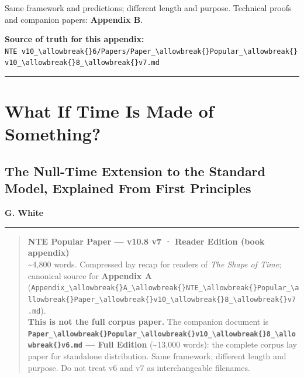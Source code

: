 \documentclass[
  11pt,
]{article}
\begin{document}
Same framework and predictions; different length and purpose. Technical
proofs and companion papers: \textbf{Appendix B}.

\textbf{Source of truth for this appendix:}
\texttt{NTE\ v10\_\textbackslash{}allowbreak\{\}6/Papers/Paper\_\textbackslash{}allowbreak\{\}Popular\_\textbackslash{}allowbreak\{\}v10\_\textbackslash{}allowbreak\{\}8\_\textbackslash{}allowbreak\{\}v7.md}

\begin{center}\rule{0.5\linewidth}{0.5pt}\end{center}

\section{What If Time Is Made of
Something?}\label{what-if-time-is-made-of-something}

\subsection{The Null-Time Extension to the Standard Model, Explained
From First
Principles}\label{the-null-time-extension-to-the-standard-model-explained-from-first-principles}

\textbf{G. White}

\begin{center}\rule{0.5\linewidth}{0.5pt}\end{center}

\begin{quote}
\textbf{NTE Popular Paper --- v10.8 v7 · Reader Edition (book
appendix)}\\
\textasciitilde4,800 words. Compressed lay recap for readers of
\emph{The Shape of Time}; canonical source for \textbf{Appendix A}
(\texttt{Appendix\_\textbackslash{}allowbreak\{\}A\_\textbackslash{}allowbreak\{\}NTE\_\textbackslash{}allowbreak\{\}Popular\_\textbackslash{}allowbreak\{\}Paper\_\textbackslash{}allowbreak\{\}v10\_\textbackslash{}allowbreak\{\}8\_\textbackslash{}allowbreak\{\}v7.md}).\\
\textbf{This is not the full corpus paper.} The companion document is
\textbf{\texttt{Paper\_\textbackslash{}allowbreak\{\}Popular\_\textbackslash{}allowbreak\{\}v10\_\textbackslash{}allowbreak\{\}8\_\textbackslash{}allowbreak\{\}v6.md}
--- Full Edition} (\textasciitilde13,000 words): the complete corpus lay
paper for standalone distribution. Same framework; different length and
purpose. Do not treat v6 and v7 as interchangeable filenames.
\end{quote}
\end{document}
